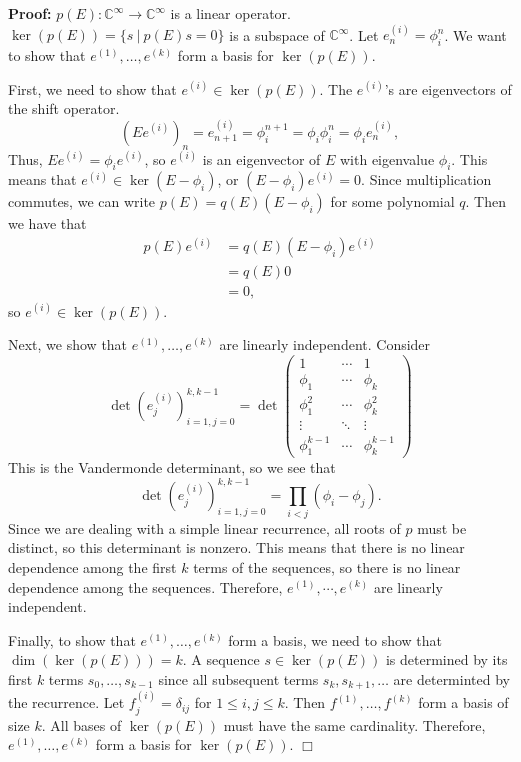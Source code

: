 \documentclass[11pt]{article}
\newenvironment{proof}{\noindent \textbf{Proof:}}{$\Box$}
\newcommand{\C}{\mathbb C} %
\begin{document}
\begin{proof}
$p(E): \C^\infty \rightarrow  \C^\infty$ is a linear operator.  $\ker(p(E)) = \{s~|~p(E)s = 0\}$ is a subspace of $\C^\infty$.  Let $e_n^{(i)} = \phi_i^n$.  We want to show that $e^{(1)}, \ldots, e^{(k)}$ form a basis for $\ker(p(E))$.

First, we need to show that $e^{(i)} \in \ker(p(E))$.  The $e^{(i)}$'s are eigenvectors of the shift operator.
$$(Ee^{(i)})_n = e^{(i)}_{n+1} = \phi_i^{n+1} = \phi_i \phi_i^n = \phi_i e_n^{(i)},$$
Thus, $Ee^{(i)} = \phi_i e^{(i)}$, so $e^{(i)}$ is an eigenvector of $E$ with eigenvalue $\phi_i$.  This means that $e^{(i)} \in \ker(E - \phi_i)$, or $(E - \phi_i)e^{(i)} = 0$.  Since multiplication commutes, we can write $p(E) = q(E)(E - \phi_i)$ for some polynomial $q$. Then we have that
$$
\begin{aligned}
p(E)e^{(i)} &= q(E)(E - \phi_i)e^{(i)} \\
           &= q(E)0 \\
           &= 0,
\end{aligned}
$$
so $e^{(i)} \in \ker(p(E))$.

Next, we show that $e^{(1)}, \ldots, e^{(k)}$ are linearly independent.  Consider
$$\det{(e_j^{(i)})_{i=1,j=0}^{k,k-1}}
=
\det{
\begin{pmatrix}
1 & \cdots & 1 \\
\phi_1 & \cdots & \phi_k \\
\phi_1^2 & \cdots & \phi_k^2 \\
\vdots & \ddots & \vdots \\
\phi_1^{k-1} & \cdots & \phi_k^{k-1} 
\end{pmatrix}
}
$$
This is the Vandermonde determinant, so we see that
$$\det{(e_j^{(i)})_{i=1,j=0}^{k,k-1}} = \prod_{i < j}{(\phi_i - \phi_j)}.$$
Since we are dealing with a simple linear recurrence, all roots of $p$ must be distinct, so this determinant is nonzero.  This means that there is no linear dependence among the first $k$ terms of the sequences, so there is no linear dependence among the sequences.  Therefore, $e^{(1)},\cdots,e^{(k)}$ are linearly independent.

Finally, to show that $e^{(1)}, \ldots, e^{(k)}$ form a basis, we need to show that $\dim(\ker(p(E))) = k$.  A sequence $s \in \ker(p(E))$ is determined by its first $k$ terms $s_0,\ldots,s_{k-1}$ since all subsequent terms $s_k,s_{k+1},\ldots$ are determinted by the recurrence.  Let $f_j^{(i)} = \delta_{ij}$ for $1 \leq i,j \leq k$.  Then $f^{(1)},\ldots,f^{(k)}$ form a basis of size $k$.  All bases of $\ker(p(E))$ must have the same cardinality.  Therefore, $e^{(1)},\ldots,e^{(k)}$ form a basis for $\ker(p(E))$.
\end{proof}
\end{document}
